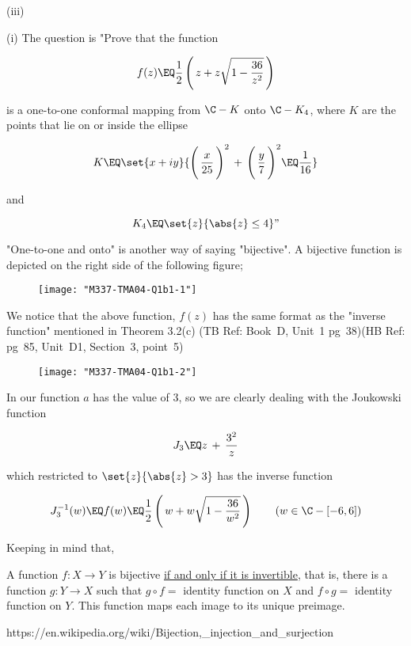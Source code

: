 \documentclass[english,a4paper,11pt]{scrartcl}
\begin{document}
\newpage
\begin{labeling}{(iii) }
  \item [(i)] The question is "Prove that the function
  
\[ f(z) \EQ \frac1{2} \left(\, z + z \sqrt{1 - \frac{36}{z^2}} \,\right) \]

is a one-to-one conformal mapping from $\C - K$ onto $\C - K_4$, where $K$ are the points that lie on or inside the ellipse

\[ K \EQ \set{x + iy}{ \Bigg(\, \frac{x}{25} \,\Bigg)^2 \,+\, \Bigg(\, \frac{y}{7} \,\Bigg)^2 \EQ \frac1{16} } \]

and

\[ K_4 \EQ \set{z}{\abs{z} \leq 4}" \]
  
\bigskip
"One-to-one and onto" is another way of saying "bijective". A bijective function is depicted on the right side of the following figure; \\

\begin{figure}[H]
	\centering
	\texttt{[image: "M337-TMA04-Q1b1-1"]}
\end{figure}
  
\bigskip
We notice that the above function, $f(z)$ has the same format as the "inverse function" mentioned in Theorem 3.2(c) (TB Ref: Book~D, Unit~1 pg~38)(HB Ref: pg~85, Unit~D1, Section~3, point~5)  \\

\begin{figure}[H]
 	\centering
 	\texttt{[image: "M337-TMA04-Q1b1-2"]}
 \end{figure} 
  
\bigskip
In our function $a$ has the value of 3, so we are clearly dealing with the Joukowski function 

\[ J_3 \EQ z \,+\, \frac{3^2}{z} \]

which restricted to $\set{z}{\abs{z} > 3}$ has the inverse function

\[ J_3^{-1}(w) \EQ  f(w) \EQ \frac1{2} \left(\, w + w \sqrt{1 - \frac{36}{w^2}} \,\right)  \qquad (w \in \C - [-6,6]) \]

\bigskip

Keeping in mind that,

\begin{TextBox} [width=0.95, frame=black!40] {}
    A function $f : X \to Y$ is bijective \underline{if and only if it is invertible}, that is, there is a function $g: Y \to X$  such that $g \circ f =$ identity function on $X$ and $f \circ g =$ identity function on $Y$. This function maps each image to its unique preimage.
%        
\begin{flushright}
{\footnotesize https://en.wikipedia.org/wiki/Bijection,\_injection\_and\_surjection}
\end{flushright}
    

\end{TextBox}
\end{labeling}
\end{document}

